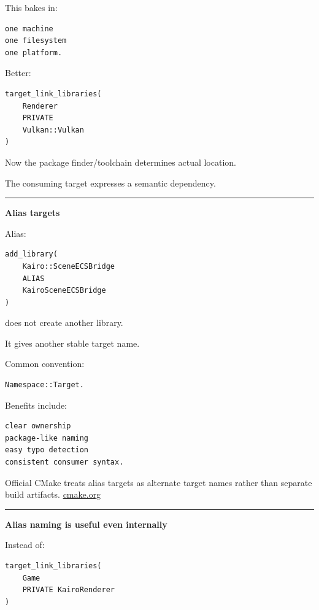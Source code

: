 This bakes in:

\begin{verbatim}
one machine
one filesystem
one platform.
\end{verbatim}

Better:

\begin{verbatim}
target_link_libraries(
    Renderer
    PRIVATE
    Vulkan::Vulkan
)
\end{verbatim}

Now the package finder/toolchain determines actual location.

The consuming target expresses a semantic dependency.

\begin{center}\rule{0.5\linewidth}{0.5pt}\end{center}

\textbf{Alias targets}

Alias:

\begin{verbatim}
add_library(
    Kairo::SceneECSBridge
    ALIAS
    KairoSceneECSBridge
)
\end{verbatim}

does not create another library.

It gives another stable target name.

Common convention:

\begin{verbatim}
Namespace::Target.
\end{verbatim}

Benefits include:

\begin{verbatim}
clear ownership
package-like naming
easy typo detection
consistent consumer syntax.
\end{verbatim}

Official CMake treats alias targets as alternate target names rather than separate build artifacts. \href{https://cmake.org/cmake/help/latest/command/add_library.html?utm_source=chatgpt.com}{cmake.org}

\begin{center}\rule{0.5\linewidth}{0.5pt}\end{center}

\textbf{Alias naming is useful even internally}

Instead of:

\begin{verbatim}
target_link_libraries(
    Game
    PRIVATE KairoRenderer
)
\end{verbatim}

